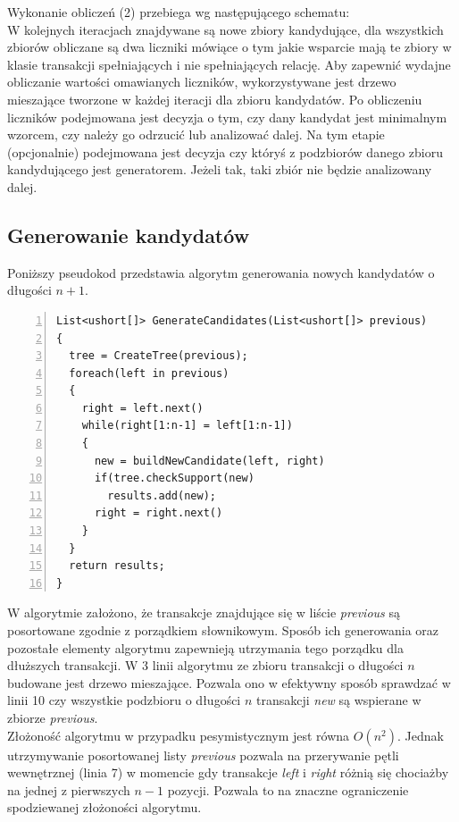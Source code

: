 \documentclass[a4paper,12pt]{article}
\begin{document}
Wykonanie obliczeń (2) przebiega wg następującego schematu:\\

W kolejnych iteracjach znajdywane są nowe zbiory kandydujące, dla wszystkich zbiorów obliczane są dwa liczniki mówiące o tym jakie wsparcie mają te zbiory w klasie transakcji spełniających i nie spełniających relację. Aby zapewnić wydajne obliczanie wartości omawianych liczników, wykorzystywane jest drzewo mieszające tworzone w każdej iteracji dla zbioru kandydatów. Po obliczeniu liczników podejmowana jest decyzja o tym, czy dany kandydat
jest minimalnym wzorcem, czy należy go odrzucić lub analizować dalej. Na tym etapie (opcjonalnie) podejmowana jest decyzja czy któryś z podzbiorów danego zbioru kandydującego jest generatorem. Jeżeli tak, taki zbiór nie będzie analizowany dalej.
\subsection{Generowanie kandydatów}
Poniższy pseudokod przedstawia algorytm generowania nowych kandydatów o długości $n+1$. \\
\begin{center}
\begin{lstlisting}[numbers=left]
List<ushort[]> GenerateCandidates(List<ushort[]> previous)
{
  tree = CreateTree(previous);
  foreach(left in previous)
  {
    right = left.next()
    while(right[1:n-1] = left[1:n-1])
    {
      new = buildNewCandidate(left, right)
      if(tree.checkSupport(new)
        results.add(new);
      right = right.next()
    }
  }
  return results;
}
\end{lstlisting}
\end{center}

W algorytmie założono, że transakcje znajdujące się w liście \textit{previous} są posortowane zgodnie z porządkiem słownikowym. Sposób ich generowania oraz pozostałe elementy algorytmu zapewnieją utrzymania tego porządku dla dłuższych transakcji.
W 3 linii algorytmu ze zbioru transakcji o długości $n$ budowane jest drzewo mieszające. Pozwala ono w efektywny sposób sprawdzać w linii 10 czy wszystkie podzbioru o długości $n$ transakcji \textit{new} są wspierane w zbiorze \textit{previous}. \\

Złożoność algorytmu w przypadku pesymistycznym jest równa $O(n^2)$. Jednak utrzymywanie posortowanej listy \textit{previous} pozwala na przerywanie pętli wewnętrznej (linia 7) w momencie gdy transakcje \textit{left} i \textit{right} różnią się chociażby na jednej z pierwszych $n-1$ pozycji. Pozwala to na znaczne ograniczenie spodziewanej złożoności algorytmu.
\end{document}

